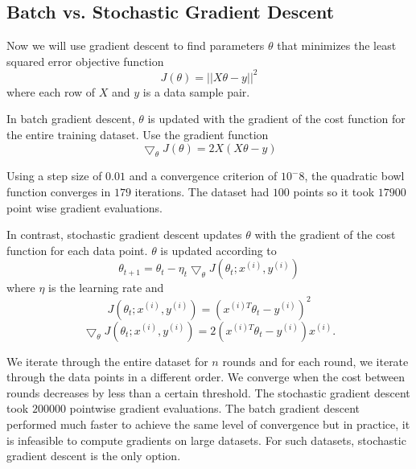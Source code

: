 \documentclass[a4paper,twoside]{article}
\begin{document}
\subsection{Batch vs. Stochastic Gradient Descent}
Now we will use gradient descent to find parameters $\theta$ that minimizes the least squared error objective function
\begin{equation}
J(\theta) = ||X\theta - y||^2
\end{equation}
where each row of $X$ and $y$ is a data sample pair. 

In batch gradient descent, $\theta$ is updated with the gradient of the cost function for the entire training dataset.
Use the gradient function
\begin{equation}
\bigtriangledown_\theta J(\theta) = 2X(X\theta - y)
\end{equation}

Using a step size of $0.01$ and a convergence criterion of $10^-8$, the quadratic bowl function converges in $179$ iterations. The dataset had $100$ points so it took $17900$ point wise gradient evaluations.

In contrast, stochastic gradient descent updates $\theta$ with the gradient of the cost function for each data point. $\theta$ is updated according to 
\begin{equation}
\theta_{t+1} = \theta_t - \eta_t \bigtriangledown_\theta J(\theta_t; x^{(i)}, y^{(i)})
\end{equation}
where $\eta$ is the learning rate and
\begin{equation}
J(\theta_t; x^{(i)}, y^{(i)}) = (x^{(i)T} \theta_t - y^{(i)})^2
\end{equation}
\begin{equation}
\bigtriangledown_\theta J(\theta_t; x^{(i)}, y^{(i)}) = 2(x^{(i)T} \theta_t - y^{(i)}) x^{(i)}.
\end{equation}

 We iterate through the entire dataset for $n$ rounds and for each round, we iterate through the data points in a different order. We converge when the cost between rounds decreases by less than a certain threshold. The stochastic gradient descent took $200000$ pointwise gradient evaluations. The batch gradient descent performed much faster to achieve the same level of convergence but in practice, it is infeasible to compute gradients on large datasets. For such datasets, stochastic gradient descent is the only option.


\end{document}
